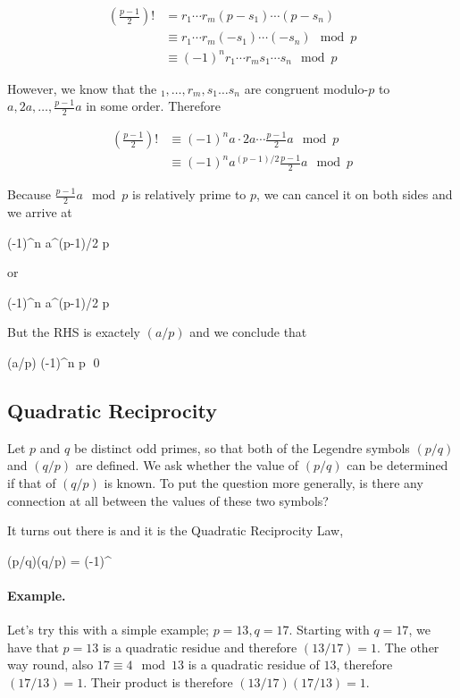 \begin{align*}
\left( \frac{p-1}{2} \right) ! &= r_1 \cdots r_m (p-s_1)\cdots (p-s_n) \\
&\equiv r_1 \cdots r_m (-s_1)\cdots (-s_n) \mod p \\
&\equiv(-1)^n r_1 \cdots r_m s_1\cdots s_n \mod p
\end{align*}

However, we know that the $_1, \ldots, r_m, s_1\ldots s_n$ are congruent modulo-$p$ to $a, 2a, \ldots, \frac{p-1}{2}a$  in some order. Therefore 

\begin{align*}
\left( \frac{p-1}{2} \right) ! &\equiv (-1)^n a \cdot 2a \cdots \frac{p-1}{2}a \mod p \\
&\equiv (-1)^n a^{(p-1)/2} \frac{p-1}{2}a \mod p
\end{align*}

Because $\frac{p-1}{2}a \mod p$ is relatively prime to $p$, we can cancel it on both sides and we arrive at

 \equiv (-1)^n a^{(p-1)/2}  \mod p \\
\eee

or

\bee
(-1)^n  \equiv a^{(p-1)/2}  \mod p \\
\eee

But the RHS is exactely $(a/p)$ and we conclude that

\bee
(a/p) \equiv (-1)^n \mod p \qed
\eee


\subsection{Quadratic Reciprocity}

Let $p$ and $q$ be distinct odd primes, so that both of the Legendre symbols $(p/q)$ and $(q/p)$ are defined. We ask whether the value of $(p/q)$ can be determined if that of $(q/p)$ is known. To put the question more generally, is there any connection at all between the values of these two symbols?

It turns out there is and it is the Quadratic Reciprocity Law,

\bee
(p/q)(q/p) = (-1)^{  }
\eee

\paragraph{Example.} Let's try this with a simple example; $p=13, q=17$. Starting with $q=17$, we have that $p=13$ is a quadratic residue and therefore $(13/17) = 1$. The other way round, also $17 \equiv 4 \mod 13$ is a quadratic residue of $13$, therefore $(17/13) = 1$. Their product is therefore $(13/17) (17/13) = 1$.

